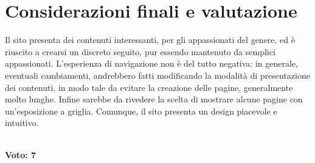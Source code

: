 \documentclass[../ProgettoTecWeb2.tex]{subfiles}
\begin{document}
\section{Considerazioni finali e valutazione}
Il sito presenta dei contenuti interessanti, per gli appassionati del genere, ed è riuscito a crearsi un discreto seguito, pur essendo mantenuto da semplici appassionati. L'esperienza di navigazione non è del tutto negativa: in generale, eventuali cambiamenti, andrebbero fatti modificando la modalità di presentazione dei contenuti, in modo tale da evitare la creazione delle pagine, generalmente molto lunghe. Infine sarebbe da rivedere la scelta di mostrare alcune pagine con un'esposizione a griglia. Comunque, il sito presenta un design piacevole e intuitivo. \\ \\
\centerline{\textbf{Voto: 7}}
\end{document}
